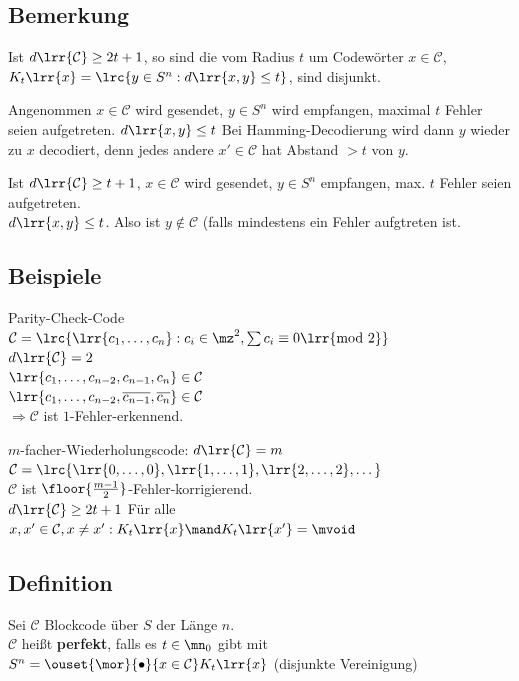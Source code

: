 	\subsection{Bemerkung}
			\item Ist $d\lrr{\mathcal{C}}\geq 2t+1$, so sind die  vom Radius $t$ um Codewörter $x\in\mathcal{C}$, $K_t\lrr{x}=\lrc{y\in S^n: d\lrr{x,y}\leq t}$, sind disjunkt.
			
				Angenommen $x\in\mathcal{C}$ wird gesendet, $y\in S^n$ wird empfangen, maximal $t$ Fehler seien aufgetreten. $d\lrr{x,y}\leq t$ Bei Hamming-Decodierung wird dann $y$ wieder zu $x$ decodiert, denn jedes andere $x'\in\mathcal{C}$ hat Abstand $>t$ von $y$.
				
			\item Ist $d\lrr{\mathcal{C}}\geq t+1$, $x\in\mathcal{C}$ wird gesendet, $y\in S^n$ empfangen, max. $t$ Fehler seien aufgetreten.\\
				$d\lrr{x,y}\leq t$. Also ist $y\notin\mathcal{C}$ (falls mindestens ein Fehler aufgtreten ist.
		\subExEnd
		
	\subsection{Beispiele}
			\item Parity-Check-Code\\
				$\mathcal{C}=\lrc{\lrr{c_1,\dots,c_n}:c_i\in\mz^2,\sum c_i\equiv 0\lrr{\mbox{mod }2}}$\\
				$d\lrr{\mathcal{C}}=2$\\
				$\lrr{c_1,\dots,c_{n-2},c_{n-1},c_n}\in\mathcal{C}$\\
				$\lrr{c_1,\dots,c_{n-2},\overline{c_{n-1}},\overline{c_n}}\in\mathcal{C}$\\
				$\Rightarrow\mathcal{C}$ ist $1$-Fehler-erkennend.
			\item $m$-facher-Wiederholungscode: $d\lrr{\mathcal{C}}=m$\\
				$\mathcal{C}=\lrc{\lrr{0,\dots,0},\lrr{1,\dots,1},\lrr{2,\dots,2},\dots}$\\
				$\mathcal{C}$ ist $\floor{\frac{m-1}{2}}$-Fehler-korrigierend.\\
				$d\lrr{\mathcal{C}}\geq 2t+1$ Für alle $x,x'\in \mathcal{C}, x\neq x': K_t\lrr{x}\mand K_t\lrr{x'}=\mvoid$
		\subExEnd
		
	\subsection{Definition}
		Sei $\mathcal{C}$ Blockcode über $S$ der Länge $n$.\\
		$\mathcal{C}$ heißt \textbf{perfekt}, falls es $t\in\mn_0$ gibt mit $S^n=\ouset{\mor}{\bullet}{x\in\mathcal{C}}K_t\lrr{x}$ (disjunkte Vereinigung)
